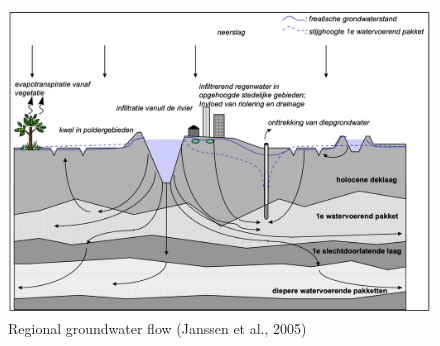 \begin{figure}[htbp]
    \centering
    \includegraphics[width=0.95\linewidth]{figures/figures theory/Janssen et al.png}
    \caption{Regional groundwater flow (Janssen et al., 2005)}
\end{figure}
\\
